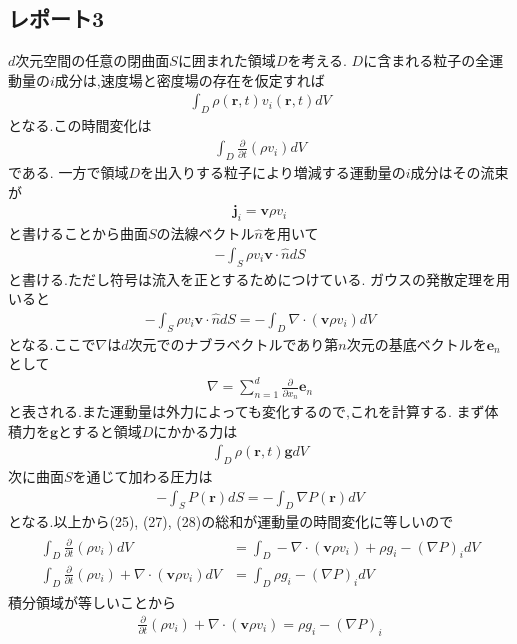 \documentclass[uplatex,a4j,11pt,dvipdfmx]{jsarticle}
\begin{document}
\subsection*{レポート3}
$d$次元空間の任意の閉曲面$S$に囲まれた領域$D$を考える.
$D$に含まれる粒子の全運動量の$i$成分は,速度場と密度場の存在を仮定すれば
\begin{align}
  \int_D\rho({\bm r},t)v_i({\bm r},t)dV
\end{align}
となる.この時間変化は
\begin{align}
  \int_D\frac{\partial}{\partial t}(\rho v_i)dV
\end{align}
である.
一方で領域$D$を出入りする粒子により増減する運動量の$i$成分はその流束が
\begin{align}
  {\bm j}_i={\bm v}\rho v_i
\end{align}
と書けることから曲面$S$の法線ベクトル$\hat{n}$を用いて
\begin{align}
  -\int_S\rho v_i{\bm v}\cdot\hat{n}dS
\end{align}
と書ける.ただし符号は流入を正とするためにつけている.
ガウスの発散定理を用いると
\begin{align}
  -\int_S\rho v_i{\bm v}\cdot\hat{n}dS=-\int_D\nabla\cdot({\bm v}\rho v_i)dV
\end{align}
となる.ここで$\nabla$は$d$次元でのナブラベクトルであり第$n$次元の基底ベクトルを${\bm e}_n$として
\begin{align}
  \nabla=\sum_{n=1}^d\frac{\partial}{\partial x_n}{\bm e}_n
\end{align}
と表される.また運動量は外力によっても変化するので,これを計算する.
まず体積力を$\bm g$とすると領域$D$にかかる力は
\begin{align}
  \int_D\rho({\bm r},t){\bm g}dV
\end{align}
次に曲面$S$を通じて加わる圧力は
\begin{align}
  -\int_SP({\bm r})dS=-\int_D\nabla P({\bm r})dV
\end{align}
となる.以上から(25), (27), (28)の総和が運動量の時間変化に等しいので
\begin{align}
  \begin{split}
    \int_D\frac{\partial}{\partial t}(\rho v_i)dV&=
    \int_D-\nabla\cdot({\bm v}\rho v_i)+\rho g_i-(\nabla P)_idV\\
    \int_D\frac{\partial}{\partial t}(\rho v_i)+\nabla\cdot({\bm v}\rho v_i)dV&=\int_D\rho g_i-(\nabla P)_idV
  \end{split}
\end{align}
積分領域が等しいことから
\begin{align}
  \frac{\partial}{\partial t}(\rho v_i)+\nabla\cdot({\bm v}\rho v_i)=\rho g_i-(\nabla P)_i
\end{align}
\end{document}
